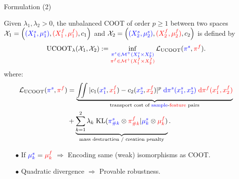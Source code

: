\documentclass{beamer}
\newcommand{\ucoot}{\text{UCOOT}}
\newcommand{\cX}{\mathcal X}
\newcommand{\cM}{\mathcal M}
\newcommand{\cL}{\mathcal L}
\newcommand{\pis}{{\color{blue}{\pi^s}}}
\newcommand{\pif}{{\color{red}{\pi^f}}}
\newcommand{\sfspace}{{\color{blue}{s.}}{\color{red}{f. }}}
\begin{document}
\begin{frame}{Formulation (2)}
\scriptsize
\vspace{-0.8cm}
\begin{definition}[UCOOT]
  Given $\lambda_1, \lambda_2 >0$, the unbalanced COOT of order $p \geq 1$
  between two \sfspace spaces $\cX_1 = \left({\color{blue}{(X_1^s, \mu_1^s)}}, {\color{red}{(X_1^f, \mu_1^f)}}, c_1 \right)$
  and $\cX_2 = \left({\color{blue}{(X_2^s, \mu_2^s)}}, {\color{red}{(X_2^f, \mu_2^f)}}, c_2 \right)$ is defined by
  \begin{align*}
\label{eq:ucoot}
    \ucoot_{\lambda}(\cX_1, \cX_2) :=
  \inf_{\substack{{\color{blue}{\pi^s \in \cM^+(X_1^s \times X_2^s)}}
  \\ {\color{red}{\pi^f \in \cM^+(X_1^f \times X_2^f)}}}}
  \cL_{\ucoot}(\pis, \pif).
\end{align*}
\vspace{-0.8cm}
where:
\begin{align*}
    \cL_{\ucoot}(\pis, \pif) &= \underbrace{\iint
    |c_1({\color{blue}{x_1^s}}, {\color{red}{x_1^f}}) - c_2({\color{blue}{x_2^s}}, {\color{red}{x_2^f}})|^p \; {\color{blue}{\mathrm d\pi^s(x_1^s, x_2^s)}} \;
    {\color{red}{\mathrm d \pi^f(x_1^f, x_2^f)}}}_{\text{transport cost of {\color{blue}{sample}}-{\color{red}{feature}} pairs}} \\
    &+ \underbrace{\sum_{k=1}^2\lambda_k \; \text{KL}({\color{blue}{\pi^s_{\# k}}} \otimes {\color{red}{\pi^f_{\# k}}} \vert {\color{blue}{\mu^s_k}} \otimes {\color{red}{\mu^f_k}})}_{\text{mass destruction / creation penalty}}.
\end{align*}
\end{definition}

\begin{itemize}
  \item[$\bullet$] If ${\color{blue}{\mu^s_k}} = {\color{red}{\mu^f_k}}$ $\Rightarrow$
  Encoding same (weak) isomorphisms as COOT.
  \item[$\bullet$] Quadratic divergence $\Rightarrow$ Provable robustness.
\end{itemize}



\end{frame}
\end{document}
